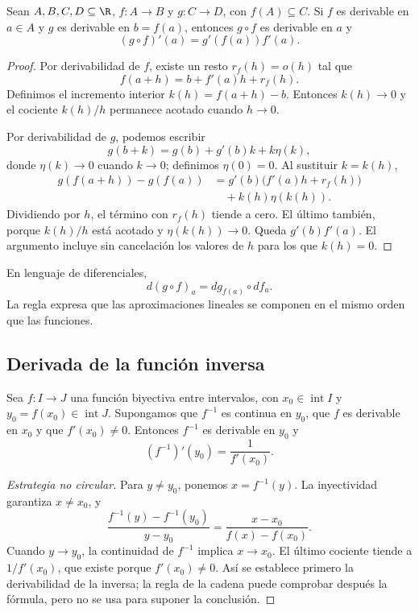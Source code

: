 \begin{teorema}
Sean \(A,B,C,D\subseteq\R\), \(f:A\to B\) y \(g:C\to D\), con
\(f(A)\subseteq C\). Si \(f\) es derivable en \(a\in A\) y \(g\) es
derivable en \(b=f(a)\), entonces
\(g\circ f\) es derivable en \(a\) y
\[
  (g\circ f)'(a)=g'(f(a))f'(a).
\]
\end{teorema}

\begin{proof}
Por derivabilidad de \(f\), existe un resto \(r_f(h)=o(h)\) tal que
\[
  f(a+h)=b+f'(a)h+r_f(h).
\]
Definimos el incremento interior
\(k(h)=f(a+h)-b\). Entonces \(k(h)\to0\) y el cociente \(k(h)/h\) permanece
acotado cuando \(h\to0\).

Por derivabilidad de \(g\), podemos escribir
\[
  g(b+k)=g(b)+g'(b)k+k\eta(k),
\]
donde \(\eta(k)\to0\) cuando \(k\to0\); definimos \(\eta(0)=0\). Al sustituir
\(k=k(h)\),
\[
\begin{aligned}
 g(f(a+h))-g(f(a))
 &=g'(b)\bigl(f'(a)h+r_f(h)\bigr)\\
 &\quad+k(h)\eta(k(h)).
\end{aligned}
\]
Dividiendo por \(h\), el término con \(r_f(h)\) tiende a cero. El último
también, porque \(k(h)/h\) está acotado y \(\eta(k(h))\to0\). Queda
\(g'(b)f'(a)\). El argumento incluye sin cancelación los valores de \(h\) para
los que \(k(h)=0\).
\end{proof}

En lenguaje de diferenciales,
\[
  d(g\circ f)_a=dg_{f(a)}\circ df_a.
\]
La regla expresa que las aproximaciones lineales se componen en el mismo orden
que las funciones.

\subsection{Derivada de la función inversa}

\begin{teorema}
Sea \(f:I\to J\) una función biyectiva entre intervalos, con
\(x_0\in\operatorname{int}I\) y \(y_0=f(x_0)\in\operatorname{int}J\).
Supongamos que \(f^{-1}\) es continua en \(y_0\), que \(f\) es derivable en
\(x_0\) y que \(f'(x_0)\ne0\). Entonces \(f^{-1}\) es
derivable en \(y_0\) y
\[
  (f^{-1})'(y_0)=\frac1{f'(x_0)}.
\]
\end{teorema}

\begin{proof}[Estrategia no circular]
Para \(y\ne y_0\), ponemos \(x=f^{-1}(y)\). La inyectividad garantiza
\(x\ne x_0\), y
\[
 \frac{f^{-1}(y)-f^{-1}(y_0)}{y-y_0}
 =\frac{x-x_0}{f(x)-f(x_0)}.
\]
Cuando \(y\to y_0\), la continuidad de \(f^{-1}\) implica \(x\to x_0\).
El último cociente tiende a \(1/f'(x_0)\), que existe porque
\(f'(x_0)\ne0\). Así se establece primero la derivabilidad de la inversa; la
regla de la cadena puede comprobar después la fórmula, pero no se usa para
suponer la conclusión.
\end{proof}

